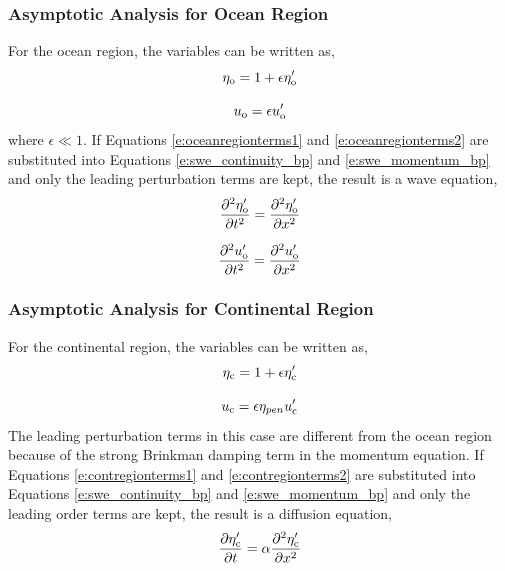 \subsubsection{Asymptotic Analysis for Ocean Region}

For the ocean region, the variables can be written as, 
%
\begin{equation} \label{e:oceanregionterms1}
\eta_{\rm o} = 1 + \epsilon \eta_{\rm o}^{\prime}
\end{equation}

\begin{equation} \label{e:oceanregionterms2}
u_{\rm o} = \epsilon u_{\rm o}^{\prime}
\end{equation}
%
where $\epsilon \ll 1$.  If Equations \ref{e:oceanregionterms1} and \ref{e:oceanregionterms2} are substituted into Equations \ref{e:swe_continuity_bp} and \ref{e:swe_momentum_bp} and only the leading perturbation terms are kept, the result is a wave equation, 
%
\begin{equation} \label{e:waveeqn_eta}
\frac{\partial ^2 \eta_{\rm o}^{\prime}}{\partial t^2} = \frac{\partial ^2 \eta_{\rm o}^{\prime}}{\partial x^2}
\end{equation}

\begin{equation} \label{e:waveeqn_u}
\frac{\partial ^2 u_{\rm o}^{\prime}}{\partial t^2} = \frac{\partial ^2 u_{\rm o}^{\prime}}{\partial x^2}
\end{equation}

\subsubsection{Asymptotic Analysis for Continental Region}

For the continental region, the variables can be written as, 
%
\begin{equation} \label{e:contregionterms1}
\eta_{\rm c} = 1 + \epsilon \eta_{\rm c}^{\prime}
\end{equation}

\begin{equation} \label{e:contregionterms2}
u_{\rm c} = \epsilon \eta_{pen} u_{\rm c}^{\prime}
\end{equation}
%
The leading perturbation terms in this case are different from the ocean region because of the strong Brinkman damping term in the momentum equation.  If Equations \ref{e:contregionterms1} and \ref{e:contregionterms2} are substituted into Equations \ref{e:swe_continuity_bp} and \ref{e:swe_momentum_bp} and only the leading order terms are kept, the result is a diffusion equation, 
%
\begin{equation} \label{e:diffeqn_eta}
\frac{\partial \eta_{\rm c}^{\prime}}{\partial t} = \alpha \frac{\partial ^2 \eta_{\rm c}^{\prime}}{\partial x^2}
\end{equation}

